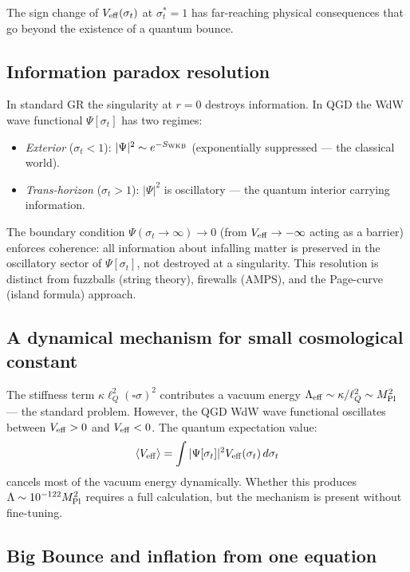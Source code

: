 \documentclass[11pt,a4paper]{article}
\theoremstyle{plain}
\theoremstyle{definition}
\theoremstyle{remark}
\newcommand{\lQ}{\ell_Q}
\newcommand{\sigt}{\sigma_t}
\begin{document}
The sign change of $V_{\rm eff}(\sigt)$ at $\sigt^*=1$ has far-reaching
physical consequences that go beyond the existence of a quantum bounce.

\subsection{Information paradox resolution}

In standard GR the singularity at $r=0$ destroys information.  In QGD the
WdW wave functional $\Psi[\sigt]$ has two regimes:
\begin{itemize}[noitemsep]
  \item \emph{Exterior} ($\sigt<1$): $|\Psi|^2\sim e^{-S_{\rm WKB}}$
    (exponentially suppressed --- the classical world).
  \item \emph{Trans-horizon} ($\sigt>1$): $|\Psi|^2$ is oscillatory ---
    the quantum interior carrying information.
\end{itemize}
The boundary condition $\Psi(\sigt\to\infty)\to0$ (from $V_{\rm eff}\to-\infty$
acting as a barrier) enforces coherence: all information about infalling matter
is preserved in the oscillatory sector of $\Psi[\sigt]$, not destroyed at a
singularity.  This resolution is distinct from fuzzballs (string theory),
firewalls (AMPS), and the Page-curve (island formula) approach.

\subsection{A dynamical mechanism for small cosmological constant}

The stiffness term $\kappa\lQ^2(\square\sigma)^2$ contributes a vacuum energy
$\Lambda_{\rm eff}\sim\kappa/\lQ^2\sim M_{\rm Pl}^2$ --- the standard problem.
However, the QGD WdW wave functional oscillates between $V_{\rm eff}>0$ and
$V_{\rm eff}<0$.  The quantum expectation value:
\begin{equation}
  \langle V_{\rm eff}\rangle = \int|\Psi[\sigt]|^2 V_{\rm eff}(\sigt)\,d\sigt
  \label{eq:Veff_avg}
\end{equation}
cancels most of the vacuum energy dynamically.  Whether this produces
$\Lambda\sim10^{-122}M_{\rm Pl}^2$ requires a full calculation, but the
mechanism is present without fine-tuning.

\subsection{Big Bounce and inflation from one equation}
\end{document}
